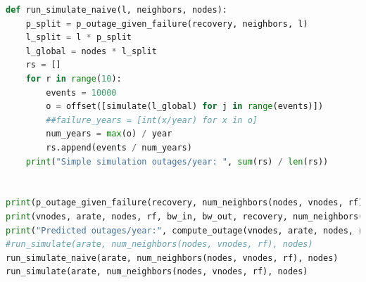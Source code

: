 \documentclass{article}
\begin{document}
\begin{lstlisting}[language=Python]
def run_simulate_naive(l, neighbors, nodes):
    p_split = p_outage_given_failure(recovery, neighbors, l)
    l_split = l * p_split
    l_global = nodes * l_split
    rs = []
    for r in range(10):
        events = 10000
        o = offset([simulate(l_global) for j in range(events)])
        ##failure_years = [int(x/year) for x in o]
        num_years = max(o) / year
        rs.append(events / num_years)
    print("Simple simulation outages/year: ", sum(rs) / len(rs))


print(p_outage_given_failure(recovery, num_neighbors(nodes, vnodes, rf), arate))
print(vnodes, arate, nodes, rf, bw_in, bw_out, recovery, num_neighbors(nodes, vnodes, rf))
print("Predicted outages/year:", compute_outage(vnodes, arate, nodes, rf, bw_in, bw_out))
#run_simulate(arate, num_neighbors(nodes, vnodes, rf), nodes)
run_simulate_naive(arate, num_neighbors(nodes, vnodes, rf), nodes)
run_simulate(arate, num_neighbors(nodes, vnodes, rf), nodes)
\end{lstlisting}
\end{document}
